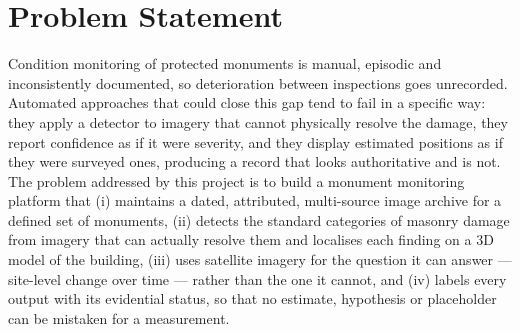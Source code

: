 \documentclass[a4paper,12pt,oneside]{book}
\begin{document}
\section{Problem Statement}
Condition monitoring of protected monuments is manual, episodic and inconsistently documented, so deterioration between inspections goes unrecorded. Automated approaches that could close this gap tend to fail in a specific way: they apply a detector to imagery that cannot physically resolve the damage, they report confidence as if it were severity, and they display estimated positions as if they were surveyed ones, producing a record that looks authoritative and is not. The problem addressed by this project is to build a monument monitoring platform that (i) maintains a dated, attributed, multi-source image archive for a defined set of monuments, (ii) detects the standard categories of masonry damage from imagery that can actually resolve them and localises each finding on a 3D model of the building, (iii) uses satellite imagery for the question it can answer --- site-level change over time --- rather than the one it cannot, and (iv) labels every output with its evidential status, so that no estimate, hypothesis or placeholder can be mistaken for a measurement.
\end{document}
